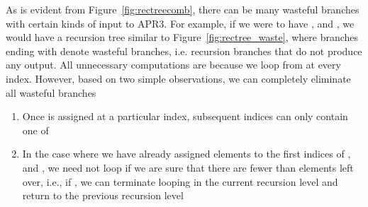 \documentclass{article}
\begin{document}
As is evident from Figure~\ref{fig:rectreecomb}, there can be many wasteful branches with certain kinds of input to APR3. For example, if we were to have ,  and , we would have a recursion tree similar to Figure~\ref{fig:rectree_waste}, where branches ending with  denote wasteful branches, i.e. recursion branches that do not produce any output. All unnecessary computations are because we loop from  at every index. However, based on two simple observations, we can completely eliminate all wasteful branches
\begin{enumerate}
 \item Once  is assigned at a particular index, subsequent indices can only contain one of 
 \item In the case where we have already assigned elements to the first  indices of , and , we need not loop if we are sure that there are fewer than  elements left over, i.e., if , we can terminate looping in the current recursion level and return to the previous recursion level
\end{enumerate}
\end{document}
